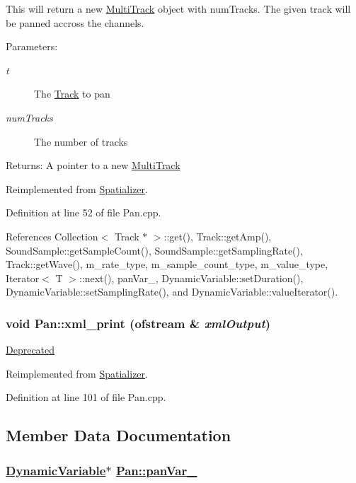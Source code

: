This will return a new \hyperlink{classMultiTrack}{Multi\-Track} object with num\-Tracks. The given track will be panned accross the channels. \begin{Desc}
\item[Parameters:]
\begin{description}
\item[{\em t}]The \hyperlink{classTrack}{Track} to pan \item[{\em num\-Tracks}]The number of tracks \end{description}
\end{Desc}
\begin{Desc}
\item[Returns:]A pointer to a new \hyperlink{classMultiTrack}{Multi\-Track} \end{Desc}


Reimplemented from \hyperlink{classSpatializer_a0}{Spatializer}.

Definition at line 52 of file Pan.cpp.

References Collection$<$ Track $\ast$ $>$::get(), Track::get\-Amp(), Sound\-Sample::get\-Sample\-Count(), Sound\-Sample::get\-Sampling\-Rate(), Track::get\-Wave(), m\_\-rate\_\-type, m\_\-sample\_\-count\_\-type, m\_\-value\_\-type, Iterator$<$ T $>$::next(), pan\-Var\_\-, Dynamic\-Variable::set\-Duration(), Dynamic\-Variable::set\-Sampling\-Rate(), and Dynamic\-Variable::value\-Iterator().\hypertarget{classPan_a4}{
\subsubsection[xml\_\-print]{\setlength{\rightskip}{0pt plus 5cm}void Pan::xml\_\-print (ofstream \& {\em xml\-Output})}}
\label{classPan_a4}


\begin{Desc}
\item[\hyperlink{deprecated__deprecated000023}{Deprecated}]\end{Desc}


Reimplemented from \hyperlink{classSpatializer_a2}{Spatializer}.

Definition at line 101 of file Pan.cpp.

\subsection{Member Data Documentation}
\hypertarget{classPan_r0}{
\subsubsection[panVar\_\-]{\setlength{\rightskip}{0pt plus 5cm}\hyperlink{classDynamicVariable}{Dynamic\-Variable}$\ast$ \hyperlink{classPan_r0}{Pan::pan\-Var\_\-}}}
\label{classPan_r0}




